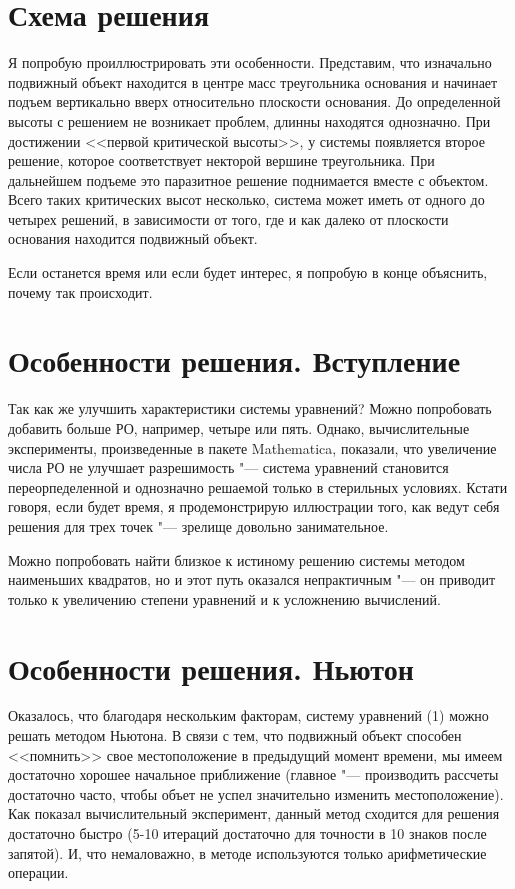 \documentclass[a4paper, 14pt]{extarticle}
\begin{document}
\section{Схема решения}
Я попробую проиллюстрировать эти особенности. Представим, что изначально подвижный объект находится в
центре масс треугольника основания и начинает подъем вертикально вверх относительно плоскости основания.
До определенной высоты с решением не возникает проблем, длинны находятся однозначно. При достижении <<первой
критической высоты>>, у системы появляется второе решение, которое соответствует некторой вершине треугольника.
При дальнейшем подъеме это паразитное решение поднимается вместе с объектом. Всего таких критических высот несколько,
система может иметь от одного до четырех решений, в зависимости от того, где и как далеко от плоскости основания
находится подвижный объект.

Если останется время или если будет интерес, я попробую в конце объяснить, почему так происходит.

\section{Особенности решения. Вступление}
Так как же улучшить характеристики системы уравнений? Можно попробовать добавить больше РО, например,
четыре или пять. Однако, вычислительные эксперименты, произведенные в пакете Mathematica, показали, что
увеличение числа РО не улучшает разрешимость "--- система уравнений становится переорпеделенной и
однозначно решаемой только в стерильных условиях. Кстати говоря, если будет время, я продемонстрирую
иллюстрации того, как ведут себя решения для трех точек "--- зрелище довольно занимательное.

Можно попробовать найти близкое к истиному решению системы методом наименьших квадратов, но и этот путь
оказался непрактичным "--- он приводит только к увеличению степени уравнений и к усложнению вычислений.

\section{Особенности решения. Ньютон}
Оказалось, что благодаря нескольким факторам, систему уравнений (1) можно решать методом Ньютона. В связи с
тем, что подвижный объект способен <<помнить>> свое местоположение в предыдущий момент времени, мы имеем достаточно
хорошее начальное приближение (главное "--- производить рассчеты достаточно часто, чтобы объет не успел значительно
изменить местоположение). Как показал вычислительный эксперимент, данный метод сходится для решения достаточно быстро
(5-10 итераций достаточно для точности в 10 знаков после запятой). И, что немаловажно, в методе используются
только арифметические операции.
\end{document}
